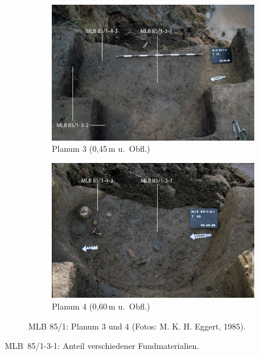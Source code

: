 \begin{figure}[p]
\centering
 \begin{subfigure}{\columnwidth}
 \centering
 \includegraphics[width=\columnwidth]{fig/MLB85-1-3_T70_E85-031-1_kompr.pdf}
 \caption{Planum 3 (0,45\,m u.~Obfl.)}
 \label{fig:MLB85_1_PlanaT70}
 \end{subfigure}\hfill
 \begin{subfigure}{\columnwidth}
 \centering
 \includegraphics[width=\columnwidth]{fig/MLB85-1-3-1_T90_E85-031-15_kompr.pdf}
 \caption{Planum 4 (0,60\,m u.~Obfl.)}
 \label{fig:MLB85_1_PlanaT90}
\end{subfigure}
 \caption{MLB 85/1: Planum 3 und 4 (Fotos: M. K. H. Eggert, 1985).}
 \label{fig:MLB85_1_PlanaT70+90_Foto}
\end{figure}

\begin{table}[p]
	\centering
	{\footnotesize }
	\caption{MLB~85/1-3-1: Anteil verschiedener Fundmaterialien.}
	\label{tab:MLB85-1-3-1_Funde}
\end{table}

